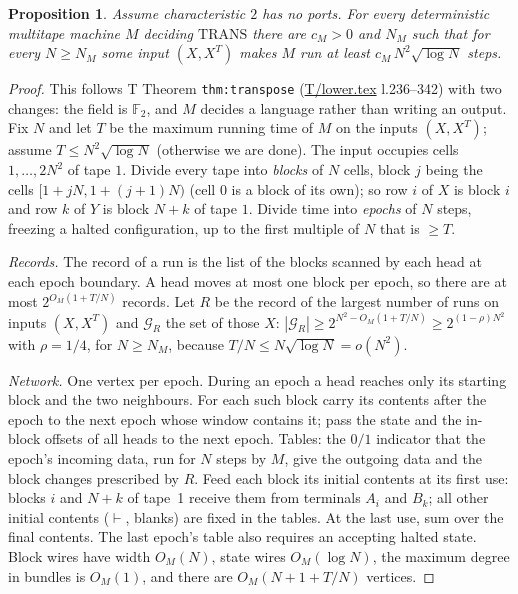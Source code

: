 \documentclass[11pt]{article}
\newtheorem{proposition}[theorem]{Proposition}
\theoremstyle{definition}
\theoremstyle{remark}
\newcommand{\F}{\mathbb F}
\newcommand{\TRANS}{\mathrm{TRANS}}
\newcommand{\src}[1]{\url{#1}}
\begin{document}
\begin{proposition}\label{prop:trans}
Assume characteristic $2$ has no ports. For every deterministic multitape machine $M$ deciding $\TRANS$ there are $c_M>0$ and
$N_M$ such that for every $N\ge N_M$ some input $(X,X^T)$ makes $M$ run at least $c_M\,N^2\sqrt{\log N}$ steps.
\end{proposition}
\begin{proof}
This follows T Theorem \texttt{thm:transpose} (\src{T/lower.tex} l.236--342) with two changes: the field is $\F_2$, and
$M$ decides a language rather than writing an output. Fix $N$ and let $T$ be the maximum running time of $M$ on the inputs
$(X,X^T)$; assume $T\le N^2\sqrt{\log N}$ (otherwise we are done). The input occupies cells $1,\dots,2N^2$ of tape $1$. Divide every
tape into \emph{blocks} of $N$ cells, block $j$ being the cells $[1+jN,1+(j+1)N)$ (cell $0$ is a block of its own); so row $i$ of
$X$ is block $i$ and row $k$ of $Y$ is block $N+k$ of tape $1$. Divide time into \emph{epochs} of $N$ steps, freezing a halted
configuration, up to the first multiple of $N$ that is $\ge T$.

\emph{Records.} The record of a run is the list of the blocks scanned by each head at each epoch boundary. A head moves at most
one block per epoch, so there are at most $2^{O_M(1+T/N)}$ records. Let $R$ be the record of the largest number of runs on inputs
$(X,X^T)$ and $\mathcal G_R$ the set of those $X$: $|\mathcal G_R|\ge2^{N^2-O_M(1+T/N)}\ge2^{(1-\rho)N^2}$ with $\rho=1/4$, for
$N\ge N_M$, because $T/N\le N\sqrt{\log N}=o(N^2)$.

\emph{Network.} One vertex per epoch. During an epoch a head reaches only its starting block and the two neighbours. For each such
block carry its contents after the epoch to the next epoch whose window contains it; pass the state and the in-block offsets of
all heads to the next epoch. Tables: the $0/1$ indicator that the epoch's incoming data, run for $N$ steps by $M$, give the outgoing
data and the block changes prescribed by $R$. Feed each block its initial contents at its first use: blocks $i$ and $N+k$ of tape~1
receive them from terminals $A_i$ and $B_k$; all other initial contents ($\vdash$, blanks) are fixed in the tables. At the last
use, sum over the final contents. The last epoch's table also requires an accepting halted state. Block wires have width
$O_M(N)$, state wires $O_M(\log N)$, the maximum degree in bundles is $O_M(1)$, and there are $O_M(N+1+T/N)$ vertices.


\end{proof}
\end{document}
